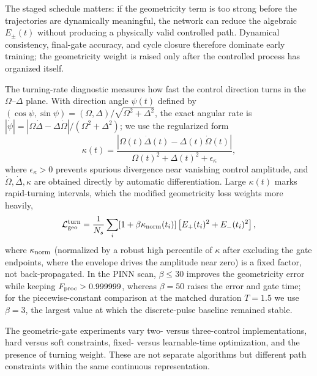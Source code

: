 \documentclass[aps,prx,reprint,superscriptaddress,nofootinbib,longbibliography,floatfix,showkeys]{revtex4-2}
\begin{document}
The staged schedule matters: if the geometricity term is too strong before the trajectories are dynamically meaningful, the network can reduce the algebraic $E_\pm(t)$ without producing a physically valid controlled path.  Dynamical consistency, final-gate accuracy, and cycle closure therefore dominate early training; the geometricity weight is raised only after the controlled process has organized itself.

The turning-rate diagnostic measures how fast the control direction turns in the $\Omega$--$\Delta$ plane.  With direction angle $\psi(t)$ defined by $(\cos\psi,\sin\psi)=(\Omega,\Delta)/\sqrt{\Omega^2+\Delta^2}$, the exact angular rate is $|\dot\psi|=|\Omega\dot\Delta-\Delta\dot\Omega|/(\Omega^2+\Delta^2)$; we use the regularized form
\begin{equation}
    \kappa(t)=\frac{|\Omega(t)\dot\Delta(t)-\Delta(t)\dot\Omega(t)|}
    {\Omega(t)^2+\Delta(t)^2+\epsilon_\kappa},
\end{equation}
where $\epsilon_\kappa>0$ prevents spurious divergence near vanishing control amplitude, and $\dot\Omega,\dot\Delta,\kappa$ are obtained directly by automatic differentiation.  Large $\kappa(t)$ marks rapid-turning intervals, which the modified geometricity loss weights more heavily,
\begin{equation}
    \mathcal L_{\rm geo}^{\rm turn}=\frac{1}{N_s}\sum_i[1+\beta\kappa_{\rm norm}(t_i)]\left[E_+(t_i)^2+E_-(t_i)^2\right],
\end{equation}
where $\kappa_{\rm norm}$ (normalized by a robust high percentile of $\kappa$ after excluding the gate endpoints, where the envelope drives the amplitude near zero) is a fixed factor, not back-propagated.  In the PINN scan, $\beta\leq30$ improves the geometricity error while keeping $F_{\rm proc}>0.999999$, whereas $\beta=50$ raises the error and gate time; for the piecewise-constant comparison at the matched duration $T=1.5$ we use $\beta=3$, the largest value at which the discrete-pulse baseline remained stable.

The geometric-gate experiments vary two- versus three-control implementations, hard versus soft constraints, fixed- versus learnable-time optimization, and the presence of turning weight.  These are not separate algorithms but different path constraints within the same continuous representation.


\end{document}
